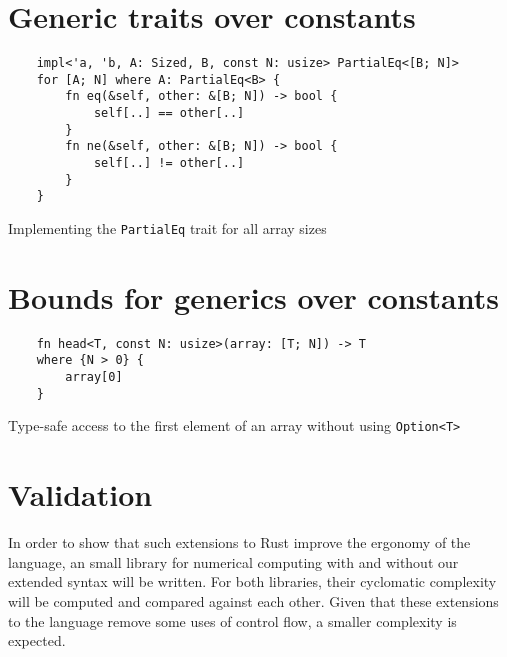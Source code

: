 \section{Generic traits over constants}

\begin{listing}[ht]
	\begin{verbatim}
    impl<'a, 'b, A: Sized, B, const N: usize> PartialEq<[B; N]> 
    for [A; N] where A: PartialEq<B> {
        fn eq(&self, other: &[B; N]) -> bool {
            self[..] == other[..]
        }
        fn ne(&self, other: &[B; N]) -> bool {
            self[..] != other[..]
        }
    }
	\end{verbatim}
    \caption{Implementing the \texttt{PartialEq} trait for all array sizes}
  \label{lst:trait_const_generics}
\end{listing}

\section{Bounds for generics over constants}

\begin{listing}[ht]
	\begin{verbatim}
    fn head<T, const N: usize>(array: [T; N]) -> T
    where {N > 0} {
        array[0]
    }
    \end{verbatim}
    \caption{Type-safe access to the first element of an array without using
    \texttt{Option<T>}}
  \label{lst:head_const_generics}
\end{listing}
\section{Validation}

In order to show that such extensions to Rust improve the ergonomy of the
language, an small library for numerical computing with and without our extended
syntax will be written. For both libraries, their cyclomatic complexity will be
computed and compared against each other. Given that these extensions to the
language remove some uses of control flow, a smaller complexity is expected.
